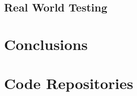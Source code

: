 \documentclass[11pt,letterpaper,oneside]{book}
\begin{document}
\section{Real World Testing}


\chapter{Conclusions}


\appendix
\chapter{Code Repositories}


% 


\end{document}
